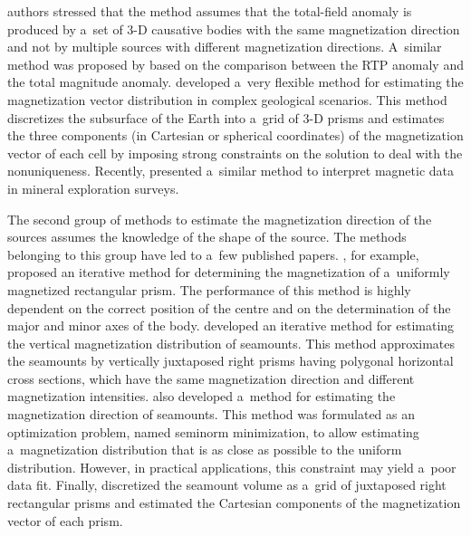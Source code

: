 \documentclass[journal abbreviation, npg]{copernicus}
\begin{document}
authors stressed that the method assumes that the total-field anomaly is
produced by a~set of 3-D causative bodies with the same magnetization
direction and not by multiple sources with different magnetization
directions. A~similar method was proposed by \citet{gerovska-etal2009} based
on the comparison between the RTP anomaly and the total magnitude anomaly.
\citet{lelievre-oldenburg2009} developed a~very flexible method for
estimating the magnetization vector distribution in complex geological
scenarios. This method discretizes the subsurface of the Earth into a~grid of
3-D prisms and estimates the three components (in Cartesian or spherical
coordinates) of the magnetization vector of each cell by imposing strong
constraints on the solution to deal with the nonuniqueness. Recently,
\citet{ellis-etal2012} presented a~similar method to interpret magnetic data
in mineral exploration surveys.

The second group of methods to estimate the magnetization direction of
the sources assumes the knowledge of the shape of the source. The
methods belonging to this group have led to a~few published
papers. \citet{bhattacharyya1966}, for example, proposed an iterative
method for determining the magnetization of a~uniformly magnetized
rectangular prism. The performance of this method is highly dependent
on the correct position of the centre and on the determination of the
major and minor axes of the body. \citet{emilia-massey1974} developed
an iterative method for estimating the vertical magnetization
distribution of seamounts. This method approximates the seamounts by
vertically juxtaposed right prisms having polygonal horizontal cross
sections, which have the same magnetization direction and different
magnetization intensities. \citet{parker-etal1987} also developed
a~method for estimating the magnetization direction of seamounts. This
method was formulated as an optimization problem, named seminorm
minimization, to allow estimating a~magnetization distribution that is
as close as possible to the uniform distribution. However, in
practical applications, this constraint may yield a~poor data
fit. Finally, \citet{kubota-uchiyama2005} discretized the seamount
volume as a~grid of juxtaposed right rectangular prisms and estimated
the Cartesian components of the magnetization vector of each prism.
\end{document}
